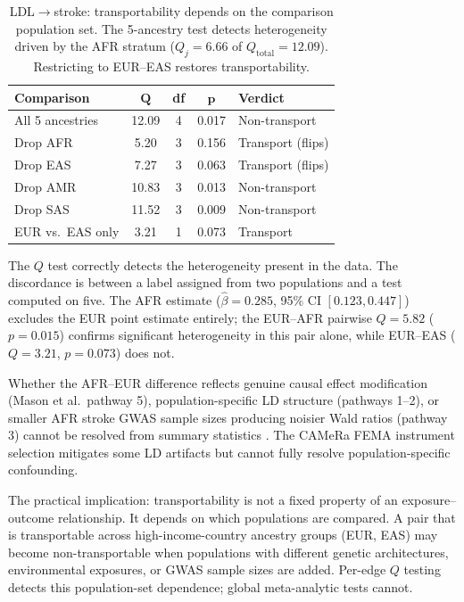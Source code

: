 \documentclass[11pt]{article}
\begin{document}
\begin{table}[t]
\centering
\caption{LDL$\to$stroke: transportability depends on the comparison population set. The 5-ancestry test detects heterogeneity driven by the AFR stratum ($Q_j = 6.66$ of $Q_{\text{total}} = 12.09$). Restricting to EUR--EAS restores transportability.}
\label{tab:ldl-stroke-loo}
\small
\begin{tabular}{@{}lcccl@{}}
\toprule
\textbf{Comparison} & $\boldsymbol{Q}$ & \textbf{df} & $\boldsymbol{p}$ & \textbf{Verdict} \\
\midrule
All 5 ancestries & 12.09 & 4 & 0.017 & Non-transport \\
Drop AFR & 5.20 & 3 & 0.156 & Transport (flips) \\
Drop EAS & 7.27 & 3 & 0.063 & Transport (flips) \\
Drop AMR & 10.83 & 3 & 0.013 & Non-transport \\
Drop SAS & 11.52 & 3 & 0.009 & Non-transport \\
EUR vs.\ EAS only & 3.21 & 1 & 0.073 & Transport \\
\bottomrule
\end{tabular}
\end{table}

The $Q$ test correctly detects the heterogeneity present in the data. The discordance is between a label assigned from two populations and a test computed on five. The AFR estimate ($\hat\beta = 0.285$, 95\% CI $[0.123, 0.447]$) excludes the EUR point estimate entirely; the EUR--AFR pairwise $Q = 5.82$ ($p = 0.015$) confirms significant heterogeneity in this pair alone, while EUR--EAS ($Q = 3.21$, $p = 0.073$) does not.

Whether the AFR--EUR difference reflects genuine causal effect modification (Mason et al.\ pathway 5), population-specific LD structure (pathways 1--2), or smaller AFR stroke GWAS sample sizes producing noisier Wald ratios (pathway 3) cannot be resolved from summary statistics \citep{mason2025multiancestry}. The CAMeRa FEMA instrument selection mitigates some LD artifacts but cannot fully resolve population-specific confounding.

The practical implication: transportability is not a fixed property of an exposure--outcome relationship. It depends on which populations are compared. A pair that is transportable across high-income-country ancestry groups (EUR, EAS) may become non-transportable when populations with different genetic architectures, environmental exposures, or GWAS sample sizes are added. Per-edge $Q$ testing detects this population-set dependence; global meta-analytic tests cannot.
\end{document}
